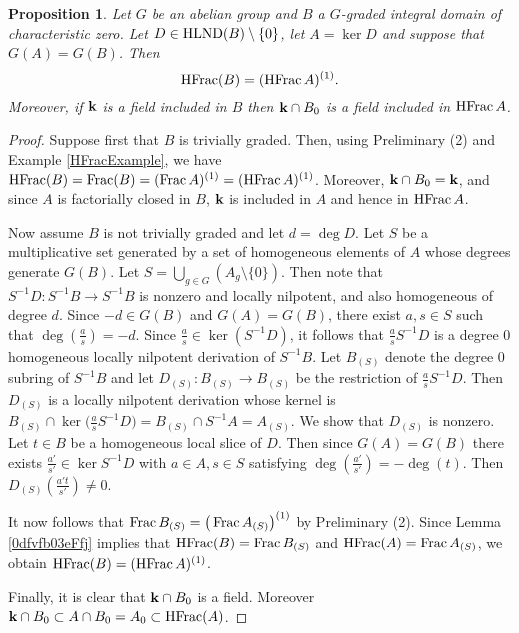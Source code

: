 \documentclass[12pt]{amsart}
\theoremstyle{plain}
\newtheorem{proposition}[subsection]{Proposition}
\theoremstyle{definition}
\newcommand{\Frac}{		\operatorname{{\rm Frac}}}
\newcommand{\HFrac}{		\operatorname{{\rm HFrac}}}
\newcommand{\bk}{{\ensuremath{\rm \bf k}}}
\newcommand{\hlnd}{\operatorname{{\rm HLND}}}
\begin{document}
	\begin{proposition} \label {mainResultGeneralized}
		Let $G$ be an abelian group and $B$ a $G$-graded integral domain of characteristic zero.
		Let $D \in \hlnd(B) \setminus \{0\}$, let $A = \ker D$ and suppose that $G(A) = G(B)$.
		Then 
		$$
		\HFrac(B) = (\HFrac A)^{(1)}.
		$$
		Moreover, if $\bk$ is a field included in $B$ then $\bk \cap B_0$ is a field included in $\HFrac A$.
	\end{proposition}
	
	\begin{proof}
		Suppose first that $B$ is trivially graded. Then, using Preliminary (2) and Example \ref{HFracExample}, we have $\HFrac(B) = \Frac(B) = (\Frac A)^{(1)}  = (\HFrac A)^{(1)}$. Moreover, $\bk \cap B_0 = \bk$, and since $A$ is factorially closed in $B$, $\bk$ is included in $A$ and hence in $\HFrac A$.
		
		Now assume $B$ is not trivially graded and let $d = \deg D$. Let $S$ be a multiplicative set generated by a set of homogeneous elements of $A$ whose degrees generate $G(B)$. Let $S = \bigcup_{g \in G} ( A_g \setminus \{0\})$. Then note that $S^{-1}D : S^{-1}B \to S^{-1}B$ is nonzero and locally nilpotent, and also homogeneous of degree $d$.
			Since $-d \in G(B)$ and $G(A) = G(B)$, there exist
		$a,s \in S$ such that $\deg(\frac{a}{s}) = -d$.  Since $\frac{a}{s} \in \ker(S^{-1}D)$,
		it follows that $\frac{a}{s} S^{-1}D$ is a degree 0 homogeneous locally nilpotent derivation of $S^{-1}B$.
		Let $B_{(S)}$ denote the degree 0 subring of $S^{-1}B$ and let $D_{(S)} : B_{(S)} \to B_{(S)}$ be the restriction of  $\frac{a}{s} S^{-1}D$. Then $D_{(S)}$ is a locally nilpotent derivation whose kernel is $B_{(S)} \cap \ker\big( \frac{a}{s} S^{-1}D \big) = B_{(S)} \cap S^{-1}A = A_{(S)}$. We show that $D_(S)$ is nonzero. Let $t \in B$ be a homogeneous local slice of $D$. Then since $G(A) = G(B)$ there exists $\frac{a'}{s'} \in \ker S^{-1}D$ with $a \in A, s \in S$ satisfying $\deg(\frac{a'}{s'}) = -\deg(t)$. Then $D_{(S)}(\frac{a't}{s'}) \neq 0$.   
		
		It now follows that $\Frac B_{(S)} = \big( \Frac A_{(S)} \big)^{(1)}$ by Preliminary (2). Since Lemma \ref{0dfvfb03eFfj} implies that $\HFrac(B) = \Frac B_{(S)}$ and $\HFrac(A) = \Frac A_{(S)}$, we obtain $\HFrac(B) = (\HFrac A)^{(1)}$.
		
		
		Finally, it is clear that $\bk \cap B_0$ is a field. Moreover $\bk \cap B_0 \subset A \cap B_0 = A_0 \subset \HFrac(A)$. 
		
		
	\end{proof}
		
\end{document}
